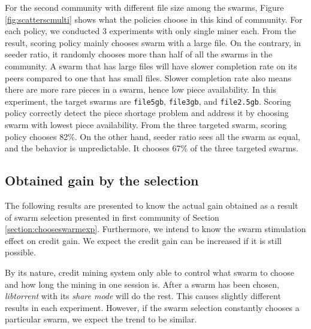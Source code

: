 For the second community with different file size among the swarms, Figure \ref{fig:scatterscmulti} shows what the policies choose in this kind of community. For each policy, we conducted 3 experiments with only single miner each. From the result, scoring policy mainly chooses swarm with a large file. On the contrary, in seeder ratio, it randomly chooses more than half of all the swarms in the community. A swarm that has large files will have slower completion rate on its peers compared to one that has small files. Slower completion rate also means there are more rare pieces in a swarm, hence low piece availability. In this experiment, the target swarms are \texttt{file5gb}, \texttt{file3gb}, and \texttt{file2.5gb}. Scoring policy correctly detect the piece shortage problem and address it by choosing swarm with lowest piece availability. From the three targeted swarm, scoring policy chooses 82\%. On the other hand, seeder ratio sees all the swarm as equal, and the behavior is unpredictable. It chooses 67\% of the three targeted swarms.

\subsection{Obtained gain by the selection}
\label{section:resultgain}
The following results are presented to know the actual gain obtained as a result of swarm selection presented in first community of Section \ref{section:chooseswarmexp}. Furthermore, we intend to know the swarm stimulation effect on credit gain. We expect the credit gain can be increased if it is still possible.

By its nature, credit mining system only able to control what swarm to choose and how long the mining in one session is. After a swarm has been chosen, \textit{libtorrent} with its \textit{share mode} will do the rest. This causes slightly different results in each experiment. However, if the swarm selection constantly chooses a particular swarm, we expect the trend to be similar. 

